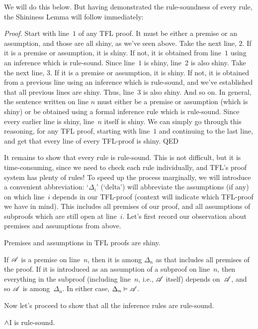 We will do this below. But having demonstrated the rule-soundness of every rule, the Shininess Lemma will follow immediately:

\emph{Proof.} Start with line~$1$ of any TFL proof. It must be either
a premise or an assumption, and those are all shiny, as we've seen
above. Take the next line, $2$. If it is a premise or assumption, it
is shiny. If not, it is obtained from line~$1$ using an inference
which is rule-sound. Since line~$1$ is shiny, line~$2$ is also shiny.
Take the next line, $3$. If it is a premise or assumption, it
is shiny. If not, it is obtained from a previous line using an inference
which is rule-sound, and we've established that all previous lines are
shiny. Thus, line~$3$ is also shiny.
And so on. In general, the sentence written on line $n$ must either be
a premise or assumption (which is shiny) or be obtained using a formal
inference rule which is rule-sound. Since every earlier line is shiny,
line~$n$ itself is shiny. We can simply go through this
reasoning, for any TFL proof, starting with line~$1$ and continuing to
the last line, and get that every line of every TFL-proof is shiny.
QED

It remains to show that every rule is rule-sound. This is not
difficult, but it is time-consuming, since we need to check each rule
individually, and TFL's proof system has plenty of rules! To speed up
the process marginally, we will introduce a convenient abbreviation:
`$\Delta_i$' (`delta') will abbreviate the assumptions (if any) on
which line~$i$ depends in our TFL-proof (context will indicate which
TFL-proof we have in mind). This includes all premises of our proof,
and all assumptions of subproofs which are still open at line~$i$.
Let's first record our observation about premises and assumptions from above.

\begin{factoidboxe}
	Premises and assumptions in TFL proofs are shiny.
\end{factoidboxe}

If $\mathscr{A}$ is a premise on line~$n$, then it is among $\Delta_n$
as that includes all premises of the proof. If it is introduced as an
assumption of a subproof on line~$n$, then everything in the subproof
(including line~$n$, i.e., $\mathscr{A}$ itself) depends on~$\mathscr{A}$,
and so $\mathscr{A}$ is among~$\Delta_n$. In either case, $\Delta_n
\vDash \mathscr{A}$.

Now let's proceed to show that all the inference rules are rule-sound.

\begin{factoidboxe}$\wedge$I is rule-sound.
\end{factoidboxe}

